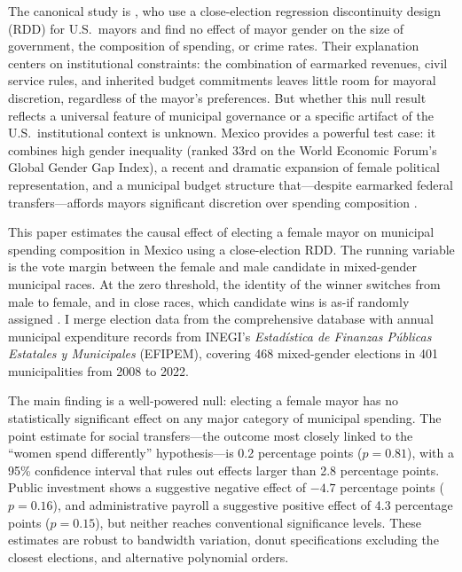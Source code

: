 \documentclass[12pt]{article}
\begin{document}
The canonical study is \citet{ferreiragyourko2014}, who use a close-election regression discontinuity design (RDD) for U.S.\ mayors and find no effect of mayor gender on the size of government, the composition of spending, or crime rates. Their explanation centers on institutional constraints: the combination of earmarked revenues, civil service rules, and inherited budget commitments leaves little room for mayoral discretion, regardless of the mayor's preferences. But whether this null result reflects a universal feature of municipal governance or a specific artifact of the U.S.\ institutional context is unknown. Mexico provides a powerful test case: it combines high gender inequality (ranked 33rd on the World Economic Forum's Global Gender Gap Index), a recent and dramatic expansion of female political representation, and a municipal budget structure that---despite earmarked federal transfers---affords mayors significant discretion over spending composition \citep{flamandmoreno2014}.

This paper estimates the causal effect of electing a female mayor on municipal spending composition in Mexico using a close-election RDD. The running variable is the vote margin between the female and male candidate in mixed-gender municipal races. At the zero threshold, the identity of the winner switches from male to female, and in close races, which candidate wins is as-if randomly assigned \citep{leelemieux2010}. I merge election data from the comprehensive \citet{emagar2025} database with annual municipal expenditure records from INEGI's \textit{Estad\'{i}stica de Finanzas P\'{u}blicas Estatales y Municipales} (EFIPEM), covering 468 mixed-gender elections in 401 municipalities from 2008 to 2022.

The main finding is a well-powered null: electing a female mayor has no statistically significant effect on any major category of municipal spending. The point estimate for social transfers---the outcome most closely linked to the ``women spend differently'' hypothesis---is 0.2 percentage points ($p=0.81$), with a 95\% confidence interval that rules out effects larger than 2.8 percentage points. Public investment shows a suggestive negative effect of $-4.7$ percentage points ($p=0.16$), and administrative payroll a suggestive positive effect of 4.3 percentage points ($p=0.15$), but neither reaches conventional significance levels. These estimates are robust to bandwidth variation, donut specifications excluding the closest elections, and alternative polynomial orders.
\end{document}
